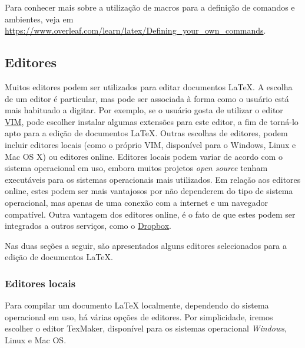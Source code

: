 \begin{marker}
  Para conhecer mais sobre a utilização de macros para a definição de comandos e ambientes, veja em \url{https://www.overleaf.com/learn/latex/Defining_your_own_commands}.
\end{marker}



\subsection{Editores}
\label{sec:editores}

Muitos editores podem ser utilizados para editar documentos \LaTeX{}. A escolha de um editor é particular, mas pode ser associada à forma como o usuário está mais habituado a digitar. Por exemplo, se o usuário gosta de utilizar o editor \href{https://www.vim.org}{VIM}, pode escolher instalar algumas extensões para este editor, a fim de torná-lo apto para a edição de documentos \LaTeX{}. Outras escolhas de editores, podem incluir editores locais (como o próprio VIM, disponível para o Windows, Linux e Mac OS X) ou editores online. Editores locais podem variar de acordo com o sistema operacional em uso, embora muitos projetos \textit{open source} tenham executáveis para os sistemas operacionais mais utilizados. Em relação aos editores online, estes podem ser mais vantajosos por não dependerem do tipo de sistema operacional, mas apenas de uma conexão com a internet e um navegador compatível. Outra vantagem dos editores online, é o fato de que estes podem ser integrados a outros serviços, como o \href{https://dropbox.com}{Dropbox}.

Nas duas seções a seguir, são apresentados alguns editores selecionados para a edição de documentos \LaTeX{}.

\subsubsection*{Editores locais}
\label{sec:ed_local}

Para compilar um documento \LaTeX{} localmente, dependendo do sistema operacional em uso, há várias opções de editores. Por simplicidade, iremos escolher o editor TexMaker, disponível para os sistemas operacional \textit{Windows}, Linux e Mac OS.

